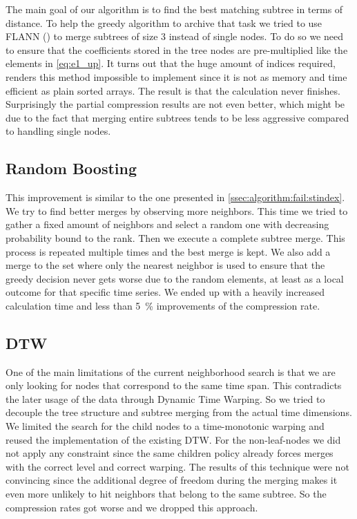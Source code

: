 The main goal of our algorithm is to find the best matching subtree in terms of distance. To help the greedy algorithm to archive that task we tried to use FLANN (\cite{FLANN}) to merge subtrees of size \num{3} instead of single nodes. To do so we need to ensure that the coefficients stored in the tree nodes are pre-multiplied like the elements in \autoref{eq:e1_up}. It turns out that the huge amount of indices required, renders this method impossible to implement since it is not as memory and time efficient as plain sorted arrays. The result is that the calculation never finishes. Surprisingly the partial compression results are not even better, which might be due to the fact that merging entire subtrees tends to be less aggressive compared to handling single nodes.


\subsection{Random Boosting}
\label{ssec:algorithm:fail:random}

This improvement is similar to the one presented in \autoref{ssec:algorithm:fail:stindex}. We try to find better merges by observing more neighbors. This time we tried to gather a fixed amount of neighbors and select a random one with decreasing probability bound to the rank. Then we execute a complete subtree merge. This process is repeated multiple times and the best merge is kept. We also add a merge to the set where only the nearest neighbor is used to ensure that the greedy decision never gets worse due to the random elements, at least as a local outcome for that specific time series. We ended up with a heavily increased calculation time and less than \SI{5}{\percent} improvements of the compression rate.


\subsection{DTW}
\label{ssec:algorithm:fail:dtw}

One of the main limitations of the current neighborhood search is that we are only looking for nodes that correspond to the same time span. This contradicts the later usage of the data through Dynamic Time Warping. So we tried to decouple the tree structure and subtree merging from the actual time dimensions. We limited the search for the child nodes to a time-monotonic warping and reused the implementation of the existing DTW\@. For the non-leaf-nodes we did not apply any constraint since the same children policy already forces merges with the correct level and correct warping. The results of this technique were not convincing since the additional degree of freedom during the merging makes it even more unlikely to hit neighbors that belong to the same subtree. So the compression rates got worse and we dropped this approach.


